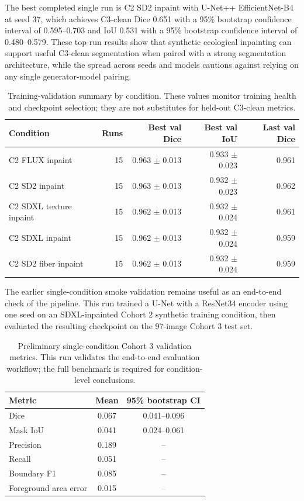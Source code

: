 The best completed single run is C2 SD2 inpaint with U-Net++ EfficientNet-B4 at seed 37, which achieves C3-clean Dice 0.651 with a 95\% bootstrap confidence interval of 0.595--0.703 and IoU 0.531 with a 95\% bootstrap confidence interval of 0.480--0.579. These top-run results show that synthetic ecological inpainting can support useful C3-clean segmentation when paired with a strong segmentation architecture, while the spread across seeds and models cautions against relying on any single generator-model pairing.

\begin{table}[H]
  \centering
  \caption{Training-validation summary by condition. These values monitor training health and checkpoint selection; they are not substitutes for held-out C3-clean metrics.}
  \label{tab:validation-condition-results}
  \begin{tabular}{lrrrr}
    \toprule
    \textbf{Condition} & \textbf{Runs} & \textbf{Best val Dice} & \textbf{Best val IoU} & \textbf{Last val Dice} \\
    \midrule
    C2 FLUX inpaint & 15 & 0.963 $\pm$ 0.013 & 0.933 $\pm$ 0.023 & 0.961 \\
    C2 SD2 inpaint & 15 & 0.963 $\pm$ 0.013 & 0.932 $\pm$ 0.023 & 0.962 \\
    C2 SDXL texture inpaint & 15 & 0.962 $\pm$ 0.013 & 0.932 $\pm$ 0.024 & 0.961 \\
    C2 SDXL inpaint & 15 & 0.962 $\pm$ 0.013 & 0.932 $\pm$ 0.024 & 0.959 \\
    C2 SD2 fiber inpaint & 15 & 0.962 $\pm$ 0.013 & 0.932 $\pm$ 0.024 & 0.959 \\
    \bottomrule
  \end{tabular}
\end{table}

The earlier single-condition smoke validation remains useful as an end-to-end check of the pipeline. This run trained a U-Net with a ResNet34 encoder using one seed on an SDXL-inpainted Cohort 2 synthetic training condition, then evaluated the resulting checkpoint on the 97-image Cohort 3 test set.

\begin{table}[H]
  \centering
  \caption{Preliminary single-condition Cohort 3 validation metrics. This run validates the end-to-end evaluation workflow; the full benchmark is required for condition-level conclusions.}
  \label{tab:preliminary-validation}
  \begin{tabular}{lcc}
    \toprule
    \textbf{Metric} & \textbf{Mean} & \textbf{95\% bootstrap CI} \\
    \midrule
    Dice & 0.067 & 0.041--0.096 \\
    Mask IoU & 0.041 & 0.024--0.061 \\
    Precision & 0.189 & -- \\
    Recall & 0.051 & -- \\
    Boundary F1 & 0.085 & -- \\
    Foreground area error & 0.015 & -- \\
    \bottomrule
  \end{tabular}
\end{table}

